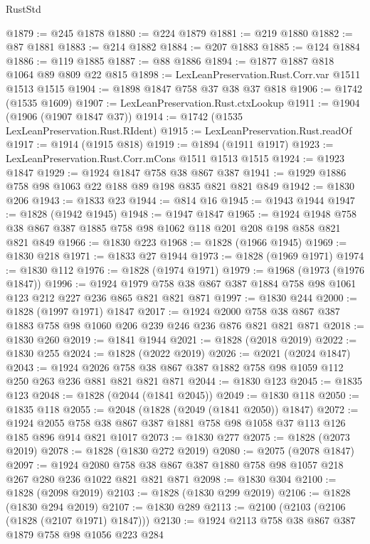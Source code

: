 \begin{lexlean}{RustStd}
\begin{coremodule}
@1879 := @245 @1878
@1880 := @224 @1879
@1881 := @219 @1880
@1882 := @87 @1881
@1883 := @214 @1882
@1884 := @207 @1883
@1885 := @124 @1884
@1886 := @119 @1885
@1887 := @88 @1886
@1894 := @1877 @1887 @818 @1064 @89 @809 @22 @815
@1898 := LexLeanPreservation.Rust.Corr.var @1511 @1513 @1515
@1904 := @1898 @1847 @758 @37 @38 @37 @818
@1906 := @1742 (@1535 @1609)
@1907 := LexLeanPreservation.Rust.ctxLookup
@1911 := @1904 (@1906 (@1907 @1847 @37))
@1914 := @1742 (@1535 LexLeanPreservation.Rust.RIdent)
@1915 := LexLeanPreservation.Rust.readOf
@1917 := @1914 (@1915 @818)
@1919 := @1894 (@1911 @1917)
@1923 := LexLeanPreservation.Rust.Corr.mCons @1511 @1513 @1515
@1924 := @1923 @1847
@1929 := @1924 @1847 @758 @38 @867 @387
@1941 := @1929 @1886 @758 @98 @1063 @22 @188 @89 @198 @835 @821 @821 @849
@1942 := @1830 @206
@1943 := @1833 @23
@1944 := @814 @16
@1945 := @1943 @1944
@1947 := @1828 (@1942 @1945)
@1948 := @1947 @1847
@1965 := @1924 @1948 @758 @38 @867 @387 @1885 @758 @98 @1062 @118 @201 @208 @198 @858 @821 @821 @849
@1966 := @1830 @223
@1968 := @1828 (@1966 @1945)
@1969 := @1830 @218
@1971 := @1833 @27 @1944
@1973 := @1828 (@1969 @1971)
@1974 := @1830 @112
@1976 := @1828 (@1974 @1971)
@1979 := @1968 (@1973 (@1976 @1847))
@1996 := @1924 @1979 @758 @38 @867 @387 @1884 @758 @98 @1061 @123 @212 @227 @236 @865 @821 @821 @871
@1997 := @1830 @244
@2000 := @1828 (@1997 @1971) @1847
@2017 := @1924 @2000 @758 @38 @867 @387 @1883 @758 @98 @1060 @206 @239 @246 @236 @876 @821 @821 @871
@2018 := @1830 @260
@2019 := @1841 @1944
@2021 := @1828 (@2018 @2019)
@2022 := @1830 @255
@2024 := @1828 (@2022 @2019)
@2026 := @2021 (@2024 @1847)
@2043 := @1924 @2026 @758 @38 @867 @387 @1882 @758 @98 @1059 @112 @250 @263 @236 @881 @821 @821 @871
@2044 := @1830 @123
@2045 := @1835 @123
@2048 := @1828 (@2044 (@1841 @2045))
@2049 := @1830 @118
@2050 := @1835 @118
@2055 := @2048 (@1828 (@2049 (@1841 @2050)) @1847)
@2072 := @1924 @2055 @758 @38 @867 @387 @1881 @758 @98 @1058 @37 @113 @126 @185 @896 @914 @821 @1017
@2073 := @1830 @277
@2075 := @1828 (@2073 @2019)
@2078 := @1828 (@1830 @272 @2019)
@2080 := @2075 (@2078 @1847)
@2097 := @1924
    @2080
    @758
    @38
    @867
    @387
    @1880
    @758
    @98
    @1057
    @218
    @267
    @280
    @236
    @1022
    @821
    @821
    @871
@2098 := @1830 @304
@2100 := @1828 (@2098 @2019)
@2103 := @1828 (@1830 @299 @2019)
@2106 := @1828 (@1830 @294 @2019)
@2107 := @1830 @289
@2113 := @2100 (@2103 (@2106 (@1828 (@2107 @1971) @1847)))
@2130 := @1924
    @2113
    @758
    @38
    @867
    @387
    @1879
    @758
    @98
    @1056
    @223
    @284

\end{coremodule}
\end{lexlean}
